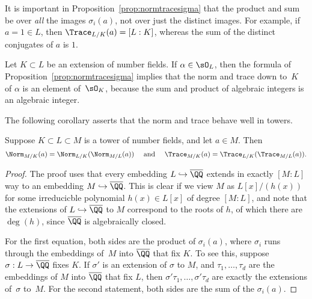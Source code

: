 \begin{warning}
  It is important in Proposition~\ref{prop:normtracesigma} that
  the product and sum be over {\em all} the images $\sigma_i(a)$,
  not over just the distinct images.  For example, if $a=1\in L$, then
  $\Trace_{L/K}(a) = [L:K]$, whereas the sum of the distinct conjugates
  of $a$ is $1$.
\end{warning}

\begin{remark}
  Let $K\subset L$ be an extension of number fields.  If
  $\alpha\in \sO_L$, then the formula of
  Proposition~\ref{prop:normtracesigma} implies that the norm and trace
  down to~$K$ of $\alpha$ is an element of~$\sO_K$, because the sum and
  product of algebraic integers is an algebraic integer.
\end{remark}

The following corollary asserts that the norm and trace behave well in
towers.
\begin{corollary}
  \label{cor:compatower}
  Suppose $K\subset L \subset M$ is a tower of number fields, and
  let $a\in M$.  Then
  $$
    \Norm_{M/K}(a) = \Norm_{L/K}(\Norm_{M/L}(a))
    \quad\text{ and }\quad
    \Trace_{M/K}(a) = \Trace_{L/K}(\Trace_{M/L}(a)).
  $$
\end{corollary}
\begin{proof}
  The proof uses that every embedding $L \hookrightarrow \overline{\QQ}$ extends in exactly
  $[M:L]$ way to an embedding $M \hookrightarrow \overline{\QQ}$.  This is clear
  if we view $M$ as $L[x]/(h(x))$ for some irreducicble
  polynomial $h(x) \in L[x]$ of degree $[M:L]$, and note that
  the extensions of $L \hookrightarrow \overline{\QQ}$ to $M$ correspond to
  the roots of $h$, of which there are $\deg(h)$, since $\overline{\QQ}$
  is algebraically closed.

  For the first equation, both sides are the product of $\sigma_i(a)$,
  where $\sigma_i$ runs through the embeddings of~$M$ into $\overline{\QQ}$
  that fix $K$.  To see this, suppose $\sigma:L\to \overline{\QQ}$ fixes $K$.
  If $\sigma'$ is an extension of $\sigma$ to $M$, and $\tau_1,\dots,
  \tau_d$ are the embeddings of $M$ into $\overline{\QQ}$ that fix $L$, then
  $\sigma'\tau_1,\dots,\sigma'\tau_d$ are exactly the extensions
  of~$\sigma$ to~$M$.  For the second statement, both sides are the
  sum of the $\sigma_i(a)$.
\end{proof}

